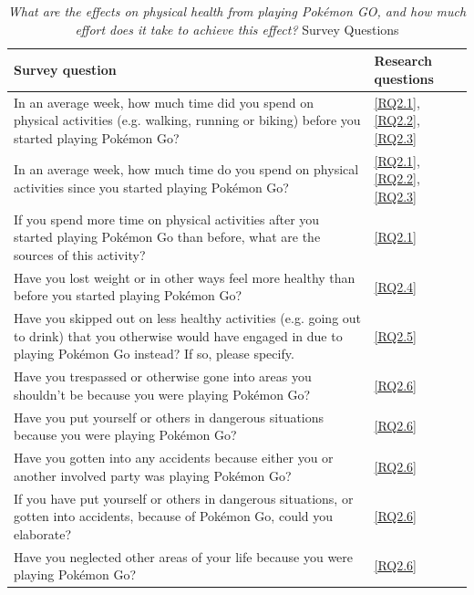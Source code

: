 \begin{table}[h]
\caption{\emph{What are the effects on physical health from playing Pokémon GO, and how much effort does it take to achieve this effect?} Survey Questions}
\centering
\label{tbl:rg2-survey-questions}
	\begin{tabularx}{\textwidth}{|X|l|}
		\hline
		\textbf{Survey question} & \textbf{Research questions}\\
		\hline\hline
		
		In an average week, how much time did you spend on physical activities (e.g. walking, running or biking) before you started playing Pokémon Go? & \ref{RQ2.1}, \ref{RQ2.2}, \ref{RQ2.3}\\
		\hline
		
		In an average week, how much time do you spend on physical activities since you started playing Pokémon Go? & \ref{RQ2.1}, \ref{RQ2.2}, \ref{RQ2.3}\\
		\hline
		
		If you spend more time on physical activities after you started playing Pokémon Go than before, what are the sources of this activity? & \ref{RQ2.1}\\
		\hline
		
		Have you lost weight or in other ways feel more healthy than before you started playing Pokémon Go? & \ref{RQ2.4}\\
		\hline
		
		Have you skipped out on less healthy activities (e.g. going out to drink) that you otherwise would have engaged in due to playing Pokémon Go instead? If so, please specify. & \ref{RQ2.5}\\
		\hline
		
		Have you trespassed or otherwise gone into areas you shouldn’t be because you were playing Pokémon Go? & \ref{RQ2.6}\\
		\hline
		
		Have you put yourself or others in dangerous situations because you were playing Pokémon Go? & \ref{RQ2.6}\\
		\hline
		
		Have you gotten into any accidents because either you or another involved party was playing Pokémon Go? & \ref{RQ2.6}\\
		\hline
		
		If you have put yourself or others in dangerous situations, or gotten into accidents, because of Pokémon Go, could you elaborate? & \ref{RQ2.6}\\
		\hline
		
		Have you neglected other areas of your life because you were playing Pokémon Go? & \ref{RQ2.6}\\
		\hline
	\end{tabularx}
\end{table}

